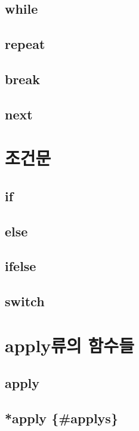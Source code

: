 \documentclass[]{book}
\theoremstyle{definition}
\theoremstyle{definition}
\theoremstyle{remark}
\begin{document}
\subsection{while}\label{while}

\subsection{repeat}\label{repeat}

\subsection{break}\label{break}

\subsection{next}\label{next}

\section{조건문}\label{introduce-if}

\subsection{if}\label{if}

\subsection{else}\label{else}

\subsection{ifelse}\label{ifelse}

\subsection{switch}\label{switch}

\section{apply류의 함수들}\label{introduce-apply}

\subsection{apply}\label{apply}

\subsection{*apply \{\#applys\}}\label{apply-applys}
\end{document}
